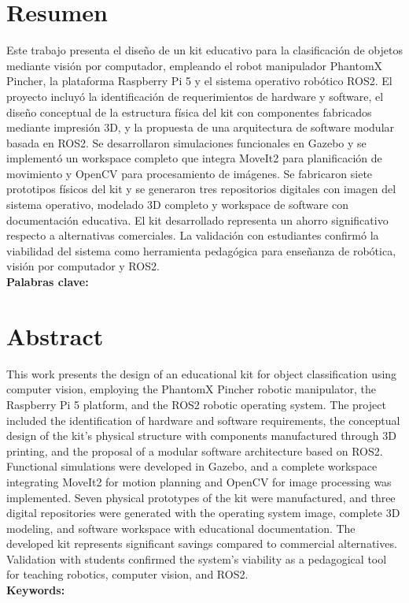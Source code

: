 \newpage
\thispagestyle{empty}
\chapter*{\sffamily Resumen}
%
\begin{center}
\textbf{\large \thesisname}
\end{center}
\par Este trabajo presenta el diseño de un kit educativo para la clasificación de objetos mediante visión por computador, empleando el robot manipulador PhantomX Pincher, la plataforma Raspberry Pi 5 y el sistema operativo robótico ROS2. El proyecto incluyó la identificación de requerimientos de hardware y software, el diseño conceptual de la estructura física del kit con componentes fabricados mediante impresión 3D, y la propuesta de una arquitectura de software modular basada en ROS2. Se desarrollaron simulaciones funcionales en Gazebo y se implementó un workspace completo que integra MoveIt2 para planificación de movimiento y OpenCV para procesamiento de imágenes. Se fabricaron siete prototipos físicos del kit y se generaron tres repositorios digitales con imagen del sistema operativo, modelado 3D completo y workspace de software con documentación educativa. El kit desarrollado representa un ahorro significativo respecto a alternativas comerciales. La validación con estudiantes confirmó la viabilidad del sistema como herramienta pedagógica para enseñanza de robótica, visión por computador y ROS2.
\\[2cm]
\textbf{Palabras clave:} \palabrasclave

\newpage
\thispagestyle{empty}
\chapter*{\sffamily Abstract}
%
\begin{center}
\textbf{\large \thesisnameeng}
\end{center}
\par This work presents the design of an educational kit for object classification using computer vision, employing the PhantomX Pincher robotic manipulator, the Raspberry Pi 5 platform, and the ROS2 robotic operating system. The project included the identification of hardware and software requirements, the conceptual design of the kit's physical structure with components manufactured through 3D printing, and the proposal of a modular software architecture based on ROS2. Functional simulations were developed in Gazebo, and a complete workspace integrating MoveIt2 for motion planning and OpenCV for image processing was implemented. Seven physical prototypes of the kit were manufactured, and three digital repositories were generated with the operating system image, complete 3D modeling, and software workspace with educational documentation. The developed kit represents significant savings compared to commercial alternatives. Validation with students confirmed the system's viability as a pedagogical tool for teaching robotics, computer vision, and ROS2.
\\[2cm]
\textbf{Keywords:} \keywords

